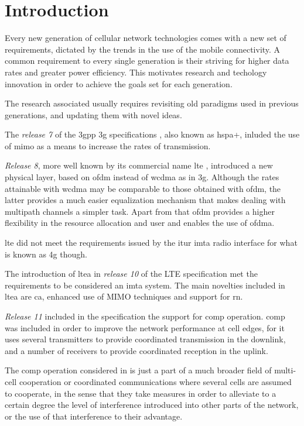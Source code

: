 \chapter{Introduction}\label{ch:intro}

Every new generation of cellular network technologies comes with a new set of
requirements, dictated by the trends in the use of the mobile connectivity. A
common requirement to every single generation is their striving for higher data
rates and greater power efficiency. This motivates research and techology
innovation in order to achieve the goals set for each generation.


The research associated usually requires revisiting old paradigms used in
previous generations, and updating them with novel ideas.


The \emph{release 7} of the \gls{3gpp} \gls{3g} specifications \cite{3gpprel7},
also known as \gls{hspa+}, inluded the use of \gls{mimo} as a means to increase
the rates of transmission.


\emph{Release 8}, more well known by its commercial name \gls{lte} \cite{3gpplte},
introduced a new physical layer, based on \gls{ofdm} instead of \gls{wcdma} as in
\gls{3g}. Although the rates attainable with \gls{wcdma} may be comparable to those
obtained with \gls{ofdm}, the latter provides a much easier equalization mechanism
that makes dealing with multipath channels a simpler task. Apart from that \gls{ofdm}
provides a higher flexibility in the resource allocation and user and enables the
use of \gls{ofdma}.

\gls{lte} did not meet the requirements issued by the \gls{itur} \gls{imta} radio
interface \cite{imta} for what is known as \gls{4g} though.

The introduction of \gls{ltea} in \emph{release 10} of the LTE specification
\cite{3gppltea} met the requirements to be considered an \gls{imta} system. The
main novelties included in \gls{ltea} are \gls{ca}, enhanced use of MIMO techniques
and support for \gls{rn}.

\emph{Release 11} \cite{3gpprel11} included in the specification the support for
\gls{comp} operation. \gls{comp} was included in order to improve the network
performance at cell edges, for it uses several transmitters to provide coordinated
transmission in the downlink, and a number of receivers to provide coordinated
reception in the uplink.

The \gls{comp} operation considered in \cite{3gpprel11} is just a part of a much
broader field of multi-cell cooperation or coordinated communications where several
cells are assumed to cooperate, in the sense that they take measures in order to
alleviate to a certain degree the level of interference introduced into other parts
of the network, or the use of that interference to their advantage.

